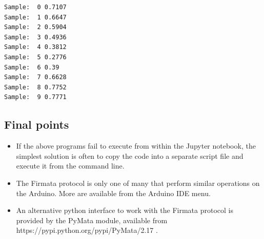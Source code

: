 \documentclass[10pt]{article}
\providecommand{\tightlist}{%
      \setlength{\itemsep}{0pt}\setlength{\parskip}{0pt}}
\begin{document}
    \begin{Verbatim}[commandchars=\\\{\}]
Sample:  0 0.7107
Sample:  1 0.6647
Sample:  2 0.5904
Sample:  3 0.4936
Sample:  4 0.3812
Sample:  5 0.2776
Sample:  6 0.39
Sample:  7 0.6628
Sample:  8 0.7752
Sample:  9 0.7771
    \end{Verbatim}

    \hypertarget{a.8-final-points}{%
\subsection{Final points}\label{a.8-final-points}}

\begin{itemize}
\tightlist
\item
  If the above programs fail to execute from within the Jupyter
  notebook, the simplest solution is often to copy the code into a
  separate script file and execute it from the command line.
\item
  The Firmata protocol is only one of many that perform similar
  operations on the Arduino. More are available from the Arduino IDE
  menu.
\item
  An alternative python interface to work with the Firmata protocol is
  provided by the PyMata module, available from
  https://pypi.python.org/pypi/PyMata/2.17 .
\end{itemize}

    


    
    
    
\end{document}
